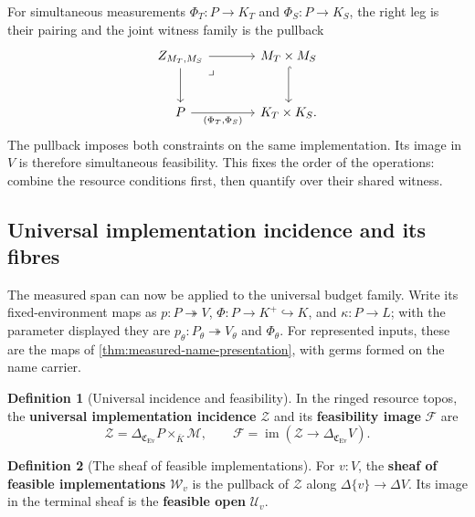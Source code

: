 \documentclass[11pt,a4paper]{article}
\numberwithin{algorithm}{section}
\numberwithin{equation}{section}
\theoremstyle{definition}
\newtheorem{definition}[definition]{Definition}
\theoremstyle{remark}
\theoremstyle{plain}
\newcommand{\incl}{\hookrightarrow}
\newcommand{\onto}{\twoheadrightarrow}
\newcommand{\Ev}{{\operatorname{Ev}}}
\newcommand{\im}{\operatorname{im}}
\newcommand{\Cplx}{\mathfrak C_{\Ev}}
\theoremstyle{definition}
\theoremstyle{plain}
\begin{document}
For simultaneous measurements $\Phi_T:P\to K_T$ and
$\Phi_S:P\to K_S$, the right leg is their pairing and the
joint witness family is the pullback
\[
\begin{tikzcd}[column sep=large,row sep=large]
 Z_{M_T,M_S} \arrow[dr,phantom,"\lrcorner",very near start] \arrow[r] \arrow[d]
   & M_T\times M_S \arrow[d,hook]\\
 P \arrow[r,"{{(\Phi_T,\Phi_S)}}"']
   & K_T\times K_S .
\end{tikzcd}
\]
The pullback imposes both constraints on the same implementation.
Its image in $V$ is therefore simultaneous feasibility. This fixes
the order of the operations: combine the resource conditions first,
then quantify over their shared witness.


\subsection{Universal implementation incidence and its fibres}
\label{sec:complexity}
\label{sec:universal-incidence}
The measured span can now be applied to the universal budget family.
Write its fixed-environment maps as $p:P\onto V$,
$\Phi:P\to K^+\incl K$, and $\kappa:P\to L$; with the parameter
displayed they are $p_\theta:P_\theta\onto V_\theta$ and
$\Phi_\theta$. For represented inputs, these are the maps of
\cref{thm:measured-name-presentation}, with germs formed on the
name carrier.


\begin{definition}[Universal incidence and feasibility]\label{def:universal-incidence}
In the ringed resource topos, the \textbf{universal implementation
incidence} $\mathscr Z$ and its \textbf{feasibility image} $\mathscr F$ are
\begin{equation}\label{eq:universal-incidence}
 \mathscr Z=\Delta_{\Cplx}P
       \times_{\bar K}\mathscr M,
 \qquad \mathscr F=\im(\mathscr Z\to\Delta_{\Cplx}V).
\end{equation}
\end{definition}

\begin{definition}[The sheaf of feasible implementations]\label{def:implementation-sheaf}
For $v:V$, the \textbf{sheaf of feasible implementations}
$\mathscr W_v$ is the pullback of $\mathscr Z$ along
$\Delta\{v\}\to\Delta V$. Its image in the terminal sheaf is
the \textbf{feasible open} $\mathcal U_v$.
\end{definition}
\end{document}
